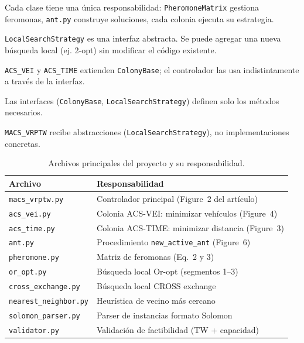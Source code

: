 \documentclass[12pt, letterpaper]{article}
\begin{document}
\begin{description}[style=nextline, leftmargin=2cm]
  \item[\textbf{Single Responsibility}] Cada clase tiene una única responsabilidad: \texttt{PheromoneMatrix} gestiona feromonas, \texttt{ant.py} construye soluciones, cada colonia ejecuta su estrategia.
  \item[\textbf{Open/Closed}] \texttt{LocalSearchStrategy} es una interfaz abstracta. Se puede agregar una nueva búsqueda local (ej. 2-opt) sin modificar el código existente.
  \item[\textbf{Liskov Substitution}] \texttt{ACS\_VEI} y \texttt{ACS\_TIME} extienden \texttt{ColonyBase}; el controlador las usa indistintamente a través de la interfaz.
  \item[\textbf{Interface Segregation}] Las interfaces (\texttt{ColonyBase}, \texttt{LocalSearchStrategy}) definen solo los métodos necesarios.
  \item[\textbf{Dependency Inversion}] \texttt{MACS\_VRPTW} recibe abstracciones (\texttt{LocalSearchStrategy}), no implementaciones concretas.
\end{description}

\begin{table}[H]
  \centering
  \caption{Archivos principales del proyecto y su responsabilidad.}
  \label{tab:archivos}
  \begin{tabular}{lp{8cm}}
    \toprule
    \textbf{Archivo} & \textbf{Responsabilidad} \\
    \midrule
    \texttt{macs\_vrptw.py} & Controlador principal (Figure~2 del artículo) \\
    \texttt{acs\_vei.py} & Colonia ACS-VEI: minimizar vehículos (Figure~4) \\
    \texttt{acs\_time.py} & Colonia ACS-TIME: minimizar distancia (Figure~3) \\
    \texttt{ant.py} & Procedimiento \texttt{new\_active\_ant} (Figure~6) \\
    \texttt{pheromone.py} & Matriz de feromonas (Eq.~2 y 3) \\
    \texttt{or\_opt.py} & Búsqueda local Or-opt (segmentos 1--3) \\
    \texttt{cross\_exchange.py} & Búsqueda local CROSS exchange \\
    \texttt{nearest\_neighbor.py} & Heurística de vecino más cercano \\
    \texttt{solomon\_parser.py} & Parser de instancias formato Solomon \\
    \texttt{validator.py} & Validación de factibilidad (TW + capacidad) \\
    \bottomrule
  \end{tabular}
\end{table}
\end{document}
